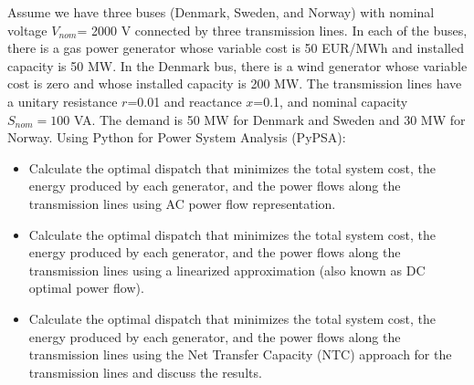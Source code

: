 \documentclass[10pt]{article}
\newenvironment{problem}[2][Problem]{\begin{trivlist}
\item[\hskip \labelsep {\bfseries #1}\hskip \labelsep {\bfseries #2.}]}{\end{trivlist}}
\begin{document}
\begin{problem}{5.4}
Assume we have three buses (Denmark, Sweden, and Norway) with nominal voltage $V_{nom}$= 2000 V connected by three transmission lines. In each of the buses, there is a gas power generator whose variable cost is 50 EUR/MWh and installed capacity is 50 MW. In the Denmark bus, there is a wind generator whose variable cost is zero and whose installed capacity is 200 MW. The transmission lines have a unitary resistance $r$=0.01 and reactance $x$=0.1, and nominal capacity $S_{nom}=100$ VA. The demand is 50 MW for Denmark and Sweden and 30 MW for Norway. Using Python for Power System Analysis (PyPSA):

\begin{itemize}
\item[a)] Calculate the optimal dispatch that minimizes the total system cost, the energy produced by each generator, and the power flows along the transmission lines using AC power flow representation.

\item[b)] Calculate the optimal dispatch that minimizes the total system cost,  the energy produced by each generator, and the power flows along the transmission lines using a linearized approximation (also known as DC optimal power flow).

\item[c)] Calculate the optimal dispatch that minimizes the total system cost,  the energy produced by each generator, and the power flows along the transmission lines using the Net Transfer Capacity (NTC) approach for the transmission lines and discuss the results.
\end{itemize}

\end{problem}

\end{document}
